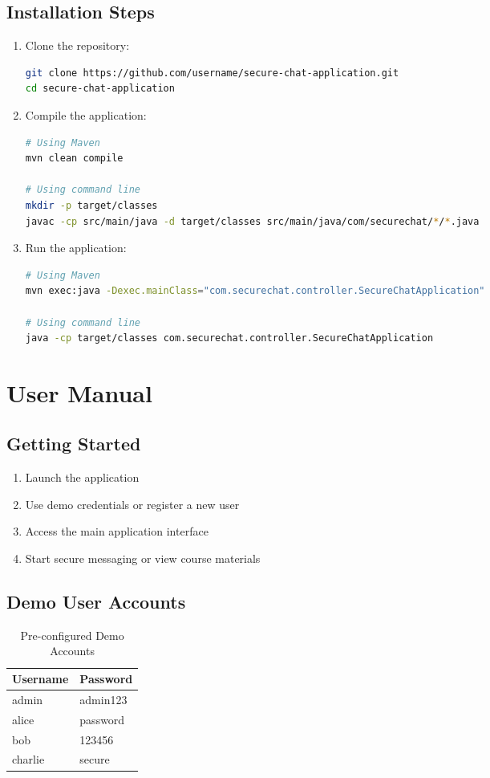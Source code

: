 \documentclass[12pt,a4paper]{article}
\begin{document}
\subsection{Installation Steps}

\begin{enumerate}
    \item Clone the repository:
    \begin{lstlisting}[language=bash]
git clone https://github.com/username/secure-chat-application.git
cd secure-chat-application
    \end{lstlisting}

    \item Compile the application:
    \begin{lstlisting}[language=bash]
# Using Maven
mvn clean compile

# Using command line
mkdir -p target/classes
javac -cp src/main/java -d target/classes src/main/java/com/securechat/*/*.java
    \end{lstlisting}

    \item Run the application:
    \begin{lstlisting}[language=bash]
# Using Maven
mvn exec:java -Dexec.mainClass="com.securechat.controller.SecureChatApplication"

# Using command line
java -cp target/classes com.securechat.controller.SecureChatApplication
    \end{lstlisting}
\end{enumerate}

\section{User Manual}

\subsection{Getting Started}

\begin{enumerate}
    \item Launch the application
    \item Use demo credentials or register a new user
    \item Access the main application interface
    \item Start secure messaging or view course materials
\end{enumerate}

\subsection{Demo User Accounts}

\begin{table}[H]
\centering
\begin{tabular}{|l|l|}
\hline
\textbf{Username} & \textbf{Password} \\
\hline
admin & admin123 \\
alice & password \\
bob & 123456 \\
charlie & secure \\
\hline
\end{tabular}
\caption{Pre-configured Demo Accounts}
\end{table}
\end{document}
